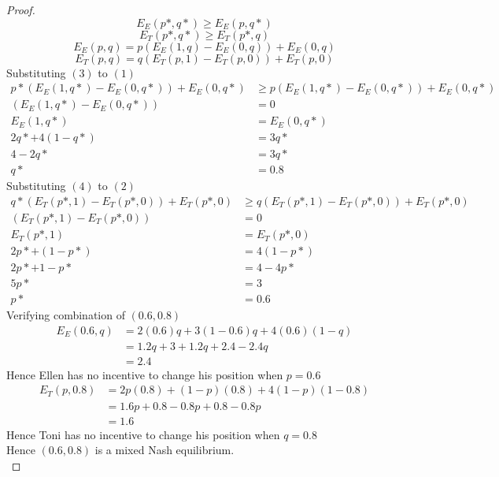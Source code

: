 \documentclass[12pt]{article}
\begin{document}
\begin{proof}
	\begin{equation}
		E_E(p*,q*)\geq E_E(p,q*)
	\end{equation}
	\begin{equation}
		E_T(p*,q*)\geq E_T(p*,q)
	\end{equation}
	\begin{equation}
		E_E(p,q) = p (E_E(1,q)-E_E(0,q)) + E_E(0,q)
	\end{equation}
	\begin{equation}
		E_T(p,q) = q (E_T(p,1)-E_T(p,0)) + E_T(p,0)
	\end{equation}
	Substituting $(3)$ to $(1)$
	\begin{align*}
		p* (E_E(1,q*)-E_E(0,q*)) + E_E(0,q*) & \geq p (E_E(1,q*)-E_E(0,q*)) + E_E(0,q*) \\
		(E_E(1,q*)-E_E(0,q*))                & = 0                                      \\
		E_E(1,q*)                            & = E_E(0,q*)                              \\
		2q*+4(1-q*)                          & = 3q*                                    \\
		4-2q*                                & = 3q*                                    \\
		q*                                   & = 0.8
	\end{align*}
	Substituting $(4)$ to $(2)$
	\begin{align*}
		q* (E_T(p*,1)-E_T(p*,0)) + E_T(p*,0) & \geq q (E_T(p*,1)-E_T(p*,0)) + E_T(p*,0) \\
		(E_T(p*,1)-E_T(p*,0))                & = 0                                      \\
		E_T(p*,1)                            & = E_T(p*,0)                              \\
		2p*+(1-p*)                           & = 4(1-p*)                                \\
		2p*+1-p*                             & = 4-4p*                                  \\
		5p*                                  & = 3                                      \\
		p*                                   & = 0.6
	\end{align*}
	Verifying combination of $(0.6,0.8)$
	\begin{align*}
		E_E(0.6,q) & =2(0.6)q+3(1-0.6)q+4(0.6)(1-q) \\
		           & =1.2q+3+1.2q+2.4-2.4q          \\
		           & =2.4
	\end{align*}
	Hence Ellen has no incentive to change his position when $p=0.6$
	\begin{align*}
		E_T(p,0.8) & =2p(0.8)+(1-p)(0.8)+4(1-p)(1-0.8) \\
		           & =1.6p+0.8-0.8p+0.8-0.8p           \\
		           & =1.6
	\end{align*}
	Hence Toni has no incentive to change his position when $q=0.8$ \\
	Hence $(0.6,0.8)$ is a mixed Nash equilibrium. \\
\end{proof}
\end{document}
